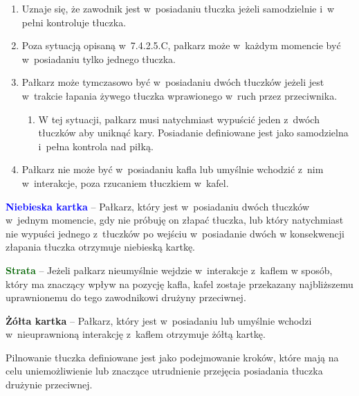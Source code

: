\documentclass[12pt,a4paper]{article}
\renewcommand{\paragraph}[1]{
  \oldparagraph{#1}%
  \leftskip2cm
}
\newcommand\yellowcard[1]{\bgroup\textcolor{darkyellow}{\textbf{#1}}}
\newcommand\bluecard[1]{\bgroup\textcolor{blue}{\textbf{#1}}}
\newcommand\other[1]{\bgroup\textcolor{darkgreen}{\textbf{#1}}}
\begin{document}
\begin{enumerate}
	\item
	      Uznaje się, że zawodnik jest w~posiadaniu tłuczka jeżeli samodzielnie
	      i~w pełni kontroluje tłuczka.
	\item
	      Poza sytuacją opisaną w~7.4.2.5.C, pałkarz może w~każdym momencie być
	      w~posiadaniu tylko jednego tłuczka.
	\item
	      Pałkarz może tymczasowo być w~posiadaniu dwóch tłuczków jeżeli jest w~trakcie łapania żywego tłuczka wprawionego w~ruch przez przeciwnika.

	      \begin{enumerate}
		      \item
		            W tej sytuacji, pałkarz musi natychmiast wypuścić jeden z~dwóch
		            tłuczków aby uniknąć kary. Posiadanie definiowane jest jako
		            samodzielna i~pełna kontrola nad piłką.
	      \end{enumerate}
	\item
	      Pałkarz nie może być w~posiadaniu kafla lub umyślnie wchodzić z~nim w~interakcje, poza rzucaniem tłuczkiem w~kafel.
\end{enumerate}

\bluecard{Niebieska kartka} -- Pałkarz, który jest w~posiadaniu dwóch
tłuczków w~jednym momencie, gdy nie próbuję on złapać tłuczka, lub który
natychmiast nie wypuści jednego z~tłuczków po wejściu w~posiadanie dwóch
w konsekwencji złapania tłuczka otrzymuje niebieską kartkę.

\other{Strata} -- Jeżeli pałkarz nieumyślnie wejdzie w~interakcje z~kaflem
w sposób, który ma znaczący wpływ na pozycję kafla, kafel zostaje
przekazany najbliższemu uprawnionemu do tego zawodnikowi drużyny
przeciwnej.

\yellowcard{Żółta kartka} -- Pałkarz, który jest w~posiadaniu lub umyślnie
wchodzi w~nieuprawnioną interakcję z~kaflem otrzymuje żółtą kartkę.

\paragraph{Pilnowanie tłuczków}
Pilnowanie tłuczka definiowane
jest jako podejmowanie kroków, które mają na celu uniemożliwienie lub
znaczące utrudnienie przejęcia posiadania tłuczka drużynie przeciwnej.
\end{document}
